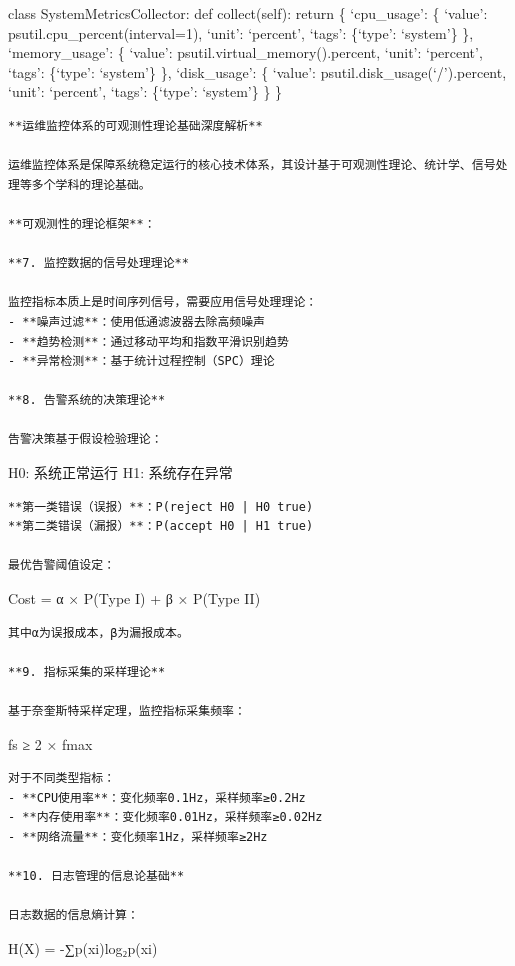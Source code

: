 class SystemMetricsCollector: def collect(self): return \{ `cpu\_usage': \{ `value': psutil.cpu\_percent(interval=1), `unit': `percent', `tags': \{`type': `system'\} \}, `memory\_usage': \{ `value': psutil.virtual\_memory().percent, `unit': `percent', `tags': \{`type': `system'\} \}, `disk\_usage': \{ `value': psutil.disk\_usage(`/').percent, `unit': `percent', `tags': \{`type': `system'\} \} \}

\begin{lstlisting}
**运维监控体系的可观测性理论基础深度解析**

运维监控体系是保障系统稳定运行的核心技术体系，其设计基于可观测性理论、统计学、信号处理等多个学科的理论基础。

**可观测性的理论框架**：

**7. 监控数据的信号处理理论**

监控指标本质上是时间序列信号，需要应用信号处理理论：
- **噪声过滤**：使用低通滤波器去除高频噪声
- **趋势检测**：通过移动平均和指数平滑识别趋势
- **异常检测**：基于统计过程控制（SPC）理论

**8. 告警系统的决策理论**

告警决策基于假设检验理论：
\end{lstlisting}

H0: 系统正常运行 H1: 系统存在异常

\begin{lstlisting}
**第一类错误（误报）**：P(reject H0 | H0 true)
**第二类错误（漏报）**：P(accept H0 | H1 true)

最优告警阈值设定：
\end{lstlisting}

Cost = α × P(Type I) + β × P(Type II)

\begin{lstlisting}
其中α为误报成本，β为漏报成本。

**9. 指标采集的采样理论**

基于奈奎斯特采样定理，监控指标采集频率：
\end{lstlisting}

fs ≥ 2 × fmax

\begin{lstlisting}
对于不同类型指标：
- **CPU使用率**：变化频率0.1Hz，采样频率≥0.2Hz
- **内存使用率**：变化频率0.01Hz，采样频率≥0.02Hz
- **网络流量**：变化频率1Hz，采样频率≥2Hz

**10. 日志管理的信息论基础**

日志数据的信息熵计算：
\end{lstlisting}

H(X) = -∑p(xi)log₂p(xi)

